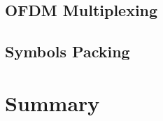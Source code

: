 \documentclass[class=report,11pt,crop=false]{standalone}
\begin{document}
\subsection{OFDM Multiplexing \label{subsect:dab-proc_ofdm-mux}}
\subsection{Symbols Packing \label{subsect:dab-proc_symbols-pack}}

\section{Summary}

\ifstandalone

\printnoidxglossary[type=\acronymtype,nonumberlist]
\fi
\end{document}
